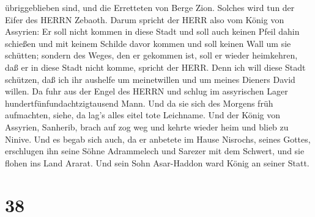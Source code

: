übriggeblieben sind, und die Erretteten von Berge Zion. Solches wird tun
der Eifer des HERRN Zebaoth.  Darum spricht der HERR also
vom König von Assyrien: Er soll nicht kommen in diese Stadt und soll
auch keinen Pfeil dahin schießen und mit keinem Schilde davor kommen und
soll keinen Wall um sie schütten;  sondern des Weges, den
er gekommen ist, soll er wieder heimkehren, daß er in diese Stadt nicht
komme, spricht der HERR.  Denn ich will diese Stadt
schützen, daß ich ihr aushelfe um meinetwillen und um meines Dieners
David willen.  Da fuhr aus der Engel des HERRN und schlug
im assyrischen Lager hundertfünfundachtzigtausend Mann. Und da sie sich
des Morgens früh aufmachten, siehe, da lag's alles eitel tote Leichname.
 Und der König von Assyrien, Sanherib, brach auf zog weg
und kehrte wieder heim und blieb zu Ninive.  Und es begab
sich auch, da er anbetete im Hause Nisrochs, seines Gottes, erschlugen
ihn seine Söhne Adrammelech und Sarezer mit dem Schwert, und sie flohen
ins Land Ararat. Und sein Sohn Asar-Haddon ward König an seiner Statt.

\hypertarget{section-37}{%
\section{38}\label{section-37}}

